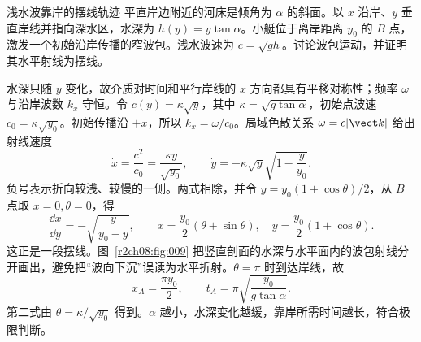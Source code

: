 \begin{practicebox}{浅水波靠岸的摆线轨迹}
平直岸边附近的河床是倾角为 $\alpha$ 的斜面。以 $x$ 沿岸、$y$ 垂直岸线并指向深水区，水深为 $h(y)=y\tan\alpha$。小艇位于离岸距离 $y_0$ 的 $B$ 点，激发一个初始沿岸传播的窄波包。浅水波速为 $c=\sqrt{gh}$。讨论波包运动，并证明其水平射线为摆线。
\label{r2ch08:pr:005}
\begin{solution}
水深只随 $y$ 变化，故介质对时间和平行岸线的 $x$ 方向都具有平移对称性；频率 $\omega$ 与沿岸波数 $k_x$ 守恒。令 $c(y)=\kappa\sqrt y$，其中 $\kappa=\sqrt{g\tan\alpha}$，初始点波速 $c_0=\kappa\sqrt{y_0}$。初始传播沿 $+x$，所以 $k_x=\omega/c_0$。局域色散关系 $\omega=c|\vect k|$ 给出射线速度
\begin{equation}
 \dot x=\frac{c^2}{c_0}=\frac{\kappa y}{\sqrt{y_0}},
 \qquad
 \dot y=-\kappa\sqrt y\sqrt{1-\frac y{y_0}}.
 \label{r2ch08:eq:033}
\end{equation}
负号表示折向较浅、较慢的一侧。两式相除，并令 $y=y_0(1+\cos\theta)/2$，从 $B$ 点取 $x=0,\theta=0$，得
\begin{equation}
 \frac{\dd x}{\dd y}=-\sqrt{\frac{y}{y_0-y}},
 \qquad
 \boxed{x=\frac{y_0}{2}(\theta+\sin\theta),\quad
 y=\frac{y_0}{2}(1+\cos\theta)}.
 \label{r2ch08:eq:034}
\end{equation}
这正是一段摆线。图~\ref{r2ch08:fig:009} 把竖直剖面的水深与水平面内的波包射线分开画出，避免把“波向下沉”误读为水平折射。$\theta=\pi$ 时到达岸线，故
\begin{equation}
 \boxed{x_A=\frac{\pi y_0}{2}},
 \qquad
 \boxed{t_A=\pi\sqrt{\frac{y_0}{g\tan\alpha}}}.
 \label{r2ch08:eq:035}
\end{equation}
第二式由 $\dot\theta=\kappa/\sqrt{y_0}$ 得到。$\alpha$ 越小，水深变化越缓，靠岸所需时间越长，符合极限判断。
\figShallowRay
\end{solution}
\end{practicebox}

